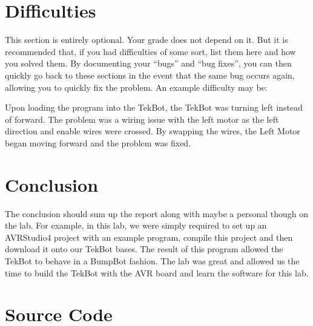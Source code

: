 \documentclass[12pt,letterpaper]{article}
\begin{document}
\section{Difficulties}

This section is entirely optional.  Your grade does not depend on it.  But it
is recommended that, if you had difficulties of some sort, list them here and
how you solved them.  By documenting your “bugs” and “bug fixes”, you can then
quickly go back to these sections in the event that the same bug occurs again,
allowing you to quickly fix the problem.  An example difficulty may be:

Upon loading the program into the TekBot, the TekBot was turning left instead
of forward.  The problem was a wiring issue with the left motor as the left
direction and enable wires were crossed.  By swapping the wires, the Left Motor
began moving forward and the problem was fixed.

\section{Conclusion}

The conclusion should sum up the report along with maybe a personal though on
the lab.  For example, in this lab, we were simply required to set up an
AVRStudio4 project with an example program, compile this project and then
download it onto our TekBot bases.  The result of this program allowed the
TekBot to behave in a BumpBot fashion.  The lab was great and allowed us the
time to build the TekBot with the AVR board and learn the software for this
lab.

\section{Source Code}


\end{document}
